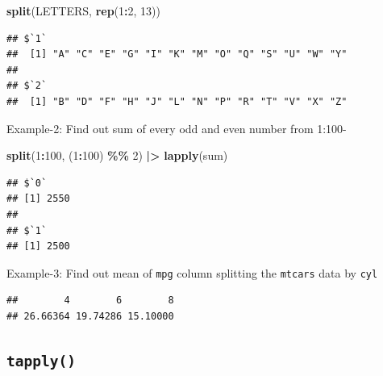\documentclass[
]{book}
\newenvironment{Shaded}{\begin{snugshade}}{\end{snugshade}}
\newcommand{\DecValTok}[1]{\textcolor[rgb]{0.00,0.00,0.81}{#1}}
\newcommand{\FunctionTok}[1]{\textcolor[rgb]{0.13,0.29,0.53}{\textbf{#1}}}
\newcommand{\NormalTok}[1]{#1}
\newcommand{\SpecialCharTok}[1]{\textcolor[rgb]{0.81,0.36,0.00}{\textbf{#1}}}
\begin{document}
\begin{Shaded}
\begin{Highlighting}[]
\FunctionTok{split}\NormalTok{(LETTERS, }\FunctionTok{rep}\NormalTok{(}\DecValTok{1}\SpecialCharTok{:}\DecValTok{2}\NormalTok{, }\DecValTok{13}\NormalTok{))}
\end{Highlighting}
\end{Shaded}

\begin{verbatim}
## $`1`
##  [1] "A" "C" "E" "G" "I" "K" "M" "O" "Q" "S" "U" "W" "Y"
## 
## $`2`
##  [1] "B" "D" "F" "H" "J" "L" "N" "P" "R" "T" "V" "X" "Z"
\end{verbatim}

Example-2: Find out sum of every odd and even number from 1:100-

\begin{Shaded}
\begin{Highlighting}[]
\FunctionTok{split}\NormalTok{(}\DecValTok{1}\SpecialCharTok{:}\DecValTok{100}\NormalTok{, (}\DecValTok{1}\SpecialCharTok{:}\DecValTok{100}\NormalTok{) }\SpecialCharTok{\%\%} \DecValTok{2}\NormalTok{) }\SpecialCharTok{|\textgreater{}} \FunctionTok{lapply}\NormalTok{(sum)}
\end{Highlighting}
\end{Shaded}

\begin{verbatim}
## $`0`
## [1] 2550
## 
## $`1`
## [1] 2500
\end{verbatim}

Example-3: Find out mean of \texttt{mpg} column splitting the \texttt{mtcars} data by \texttt{cyl}

\begin{Shaded}
\end{Shaded}

\begin{verbatim}
##        4        6        8 
## 26.66364 19.74286 15.10000
\end{verbatim}

\hypertarget{tapply}{%
\subsection{\texorpdfstring{\texttt{tapply()}}{tapply()}}\label{tapply}}
\end{document}
